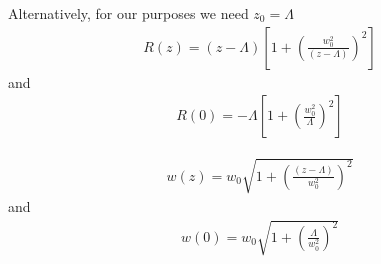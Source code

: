 Alternatively, for our purposes we need $z_0 = \Lambda$
\begin{equation}
\begin{split}
   R(z) = (z-\Lambda)\left[1 + \left(\frac{w_0^2}{(z-\Lambda)}\right)^2\right]
\end{split}
\end{equation}
and 
\begin{equation}
\begin{split}
   R(0) = -\Lambda\left[1 + \left(\frac{w_0^2}{\Lambda}\right)^2\right]
\end{split}
\end{equation}

\begin{equation}
\begin{split}
   w(z) = w_0 \sqrt{1+\left(\frac{(z-\Lambda)}{w_0^2}\right)^2}
\end{split}
\end{equation}
and
\begin{equation}
\begin{split}
   w(0) = w_0 \sqrt{1+\left(\frac{\Lambda}{w_0^2}\right)^2}
\end{split}
\end{equation}

